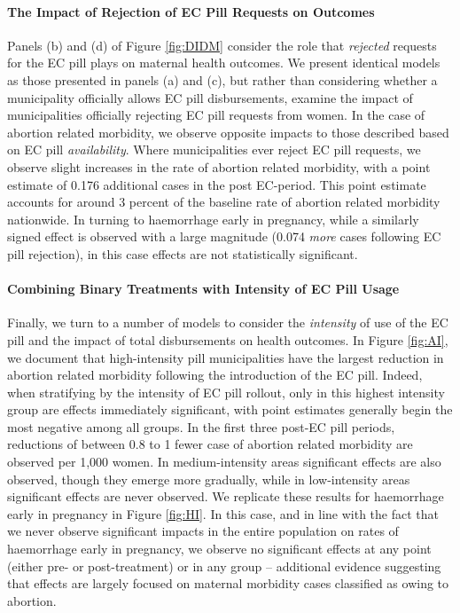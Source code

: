 \documentclass[12pt]{article}
\begin{document}
\begin{spacing}{1.9}
\paragraph{The Impact of Rejection of EC Pill Requests on Outcomes}
Panels (b) and (d) of Figure \ref{fig:DIDM} consider the role that \emph{rejected} requests for the EC pill plays on maternal health outcomes.
We present identical models as those presented in panels (a) and (c), but rather than considering whether a municipality officially allows EC pill disbursements, examine the impact of municipalities officially rejecting EC pill requests from women.  In the case of abortion related morbidity, we observe opposite impacts to those described based on EC pill \emph{availability}.  Where municipalities ever reject EC pill requests, we observe slight increases in the rate of abortion related morbidity, with a point estimate of 0.176 additional cases in the post EC-period.  This point estimate accounts for around 3 percent of the baseline rate of abortion related morbidity nationwide.  In turning to haemorrhage early in pregnancy, while a similarly signed effect is observed with a large magnitude (0.074 \emph{more} cases following EC pill rejection), in this case effects are not statistically significant. 


\paragraph{Combining Binary Treatments with Intensity of EC Pill Usage}
\label{sscn:intensity}
Finally, we turn to a number of models to consider the \emph{intensity} of use of the EC pill and the impact of total disbursements on health outcomes.  In Figure \ref{fig:AI}, we document that high-intensity pill municipalities have the largest reduction in abortion related morbidity following the introduction of the EC pill.  Indeed, when stratifying by the intensity of EC pill rollout, only in this highest intensity group are effects immediately significant, with point estimates generally begin the most negative among all groups.  In the first three post-EC pill periods, reductions of between 0.8 to 1 fewer case of abortion related morbidity are observed per 1,000 women.  In medium-intensity areas significant effects are also observed, though they emerge more gradually, while in low-intensity areas significant effects are never observed.
We replicate these results for haemorrhage early in pregnancy in Figure \ref{fig:HI}.  In this case, and in line with the fact that we never observe significant impacts in the entire population on rates of haemorrhage early in pregnancy, we observe no significant effects at any point (either pre- or post-treatment) or in any group -- additional evidence suggesting that effects are largely focused on maternal morbidity cases classified as owing to abortion.




\end{spacing}
\end{document}
